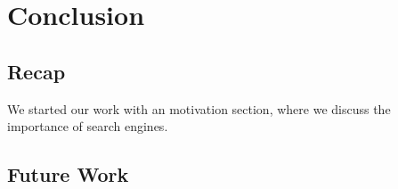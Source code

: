 \chapter{Conclusion}
\label{cha:conclusion}


\section{Recap}
\label{sec:recap}

We started our work with an motivation section, where we discuss the importance of search engines. 





\section{Future Work}
\label{sec:future_work}





